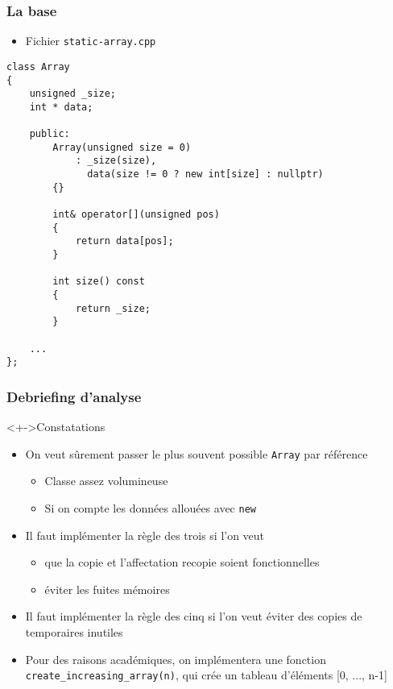 \begin{frame}[containsverbatim]
\frametitle{La base}
\begin{itemize}
\item Fichier \texttt{static-array.cpp}
\end{itemize}
\begin{lstlisting}
class Array
{
    unsigned _size;
    int * data;
    
    public:
        Array(unsigned size = 0)
            : _size(size),
              data(size != 0 ? new int[size] : nullptr)
        {}
    
        int& operator[](unsigned pos) 
        { 
        	return data[pos]; 
        }        
        
        int size() const 
        { 
        	return _size; 
        }
        
    ...
};
\end{lstlisting}
\end{frame}

\begin{frame}
\frametitle{Debriefing d'analyse}
\begin{exampleblock}<+->{Constatations}
\begin{itemize}[<+->]
\item On veut sûrement passer le plus souvent possible \texttt{Array} par référence
	\begin{itemize}
	\item Classe assez volumineuse
	\item Si on compte les données allouées avec \lstinline|new|
	\end{itemize}
\item Il faut implémenter la règle des trois si l'on veut
	\begin{itemize}
	\item que la copie et l'affectation recopie soient fonctionnelles
	\item éviter les fuites mémoires
	\end{itemize}
\item Il faut implémenter la règle des cinq si l'on veut éviter des copies de temporaires inutiles
\end{itemize}
\end{exampleblock}
\begin{itemize}[<+->]
\item Pour des raisons académiques, on implémentera une fonction \texttt{create\_increasing\_array(n)}, qui crée un tableau d'éléments [0, ..., n-1]
\end{itemize}
\end{frame}

